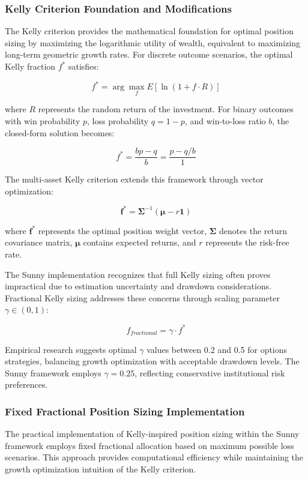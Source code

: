 \documentclass[
  american,
  11pt,
  11pt,
  letterpaper,
  onecolumn]{article}
\begin{document}
\subsubsection{Kelly Criterion Foundation and
Modifications}\label{kelly-criterion-foundation-and-modifications}

The Kelly criterion provides the mathematical foundation for optimal
position sizing by maximizing the logarithmic utility of wealth,
equivalent to maximizing long-term geometric growth rates. For discrete
outcome scenarios, the optimal Kelly fraction \(f^*\) satisfies:

\[f^* = \arg\max_{f} E[\ln(1 + f \cdot R)]\]

where \(R\) represents the random return of the investment. For binary
outcomes with win probability \(p\), loss probability \(q = 1-p\), and
win-to-loss ratio \(b\), the closed-form solution becomes:

\[f^* = \frac{bp - q}{b} = \frac{p - q/b}{1}\]

The multi-asset Kelly criterion extends this framework through vector
optimization:

\[\mathbf{f}^* = \mathbf{\Sigma}^{-1}(\mathbf{\mu} - r\mathbf{1})\]

where \(\mathbf{f}^*\) represents the optimal position weight vector,
\(\mathbf{\Sigma}\) denotes the return covariance matrix,
\(\mathbf{\mu}\) contains expected returns, and \(r\) represents the
risk-free rate.

The Sunny implementation recognizes that full Kelly sizing often proves
impractical due to estimation uncertainty and drawdown considerations.
Fractional Kelly sizing addresses these concerns through scaling
parameter \(\gamma \in (0,1)\):

\[f_{fractional} = \gamma \cdot f^*\]

Empirical research suggests optimal \(\gamma\) values between 0.2 and
0.5 for options strategies, balancing growth optimization with
acceptable drawdown levels. The Sunny framework employs
\(\gamma = 0.25\), reflecting conservative institutional risk
preferences.

\subsubsection{Fixed Fractional Position Sizing
Implementation}\label{fixed-fractional-position-sizing-implementation}

The practical implementation of Kelly-inspired position sizing within
the Sunny framework employs fixed fractional allocation based on maximum
possible loss scenarios. This approach provides computational efficiency
while maintaining the growth optimization intuition of the Kelly
criterion.
\end{document}
